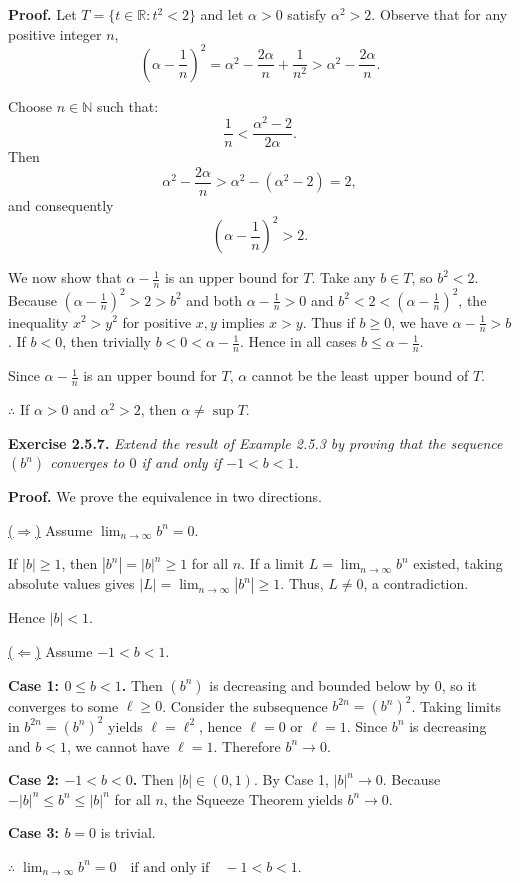 \documentclass[reqno,11pt]{amsart}
\begin{document}
\noindent\textbf{Proof.}
Let \(T = \{ t \in \mathbb{R} : t^2 < 2 \}\) and let \(\alpha > 0\) satisfy \(\alpha^2 > 2\).  
Observe that for any positive integer \(n\),
\[
\left( \alpha - \frac{1}{n} \right)^2 = \alpha^2 - \frac{2\alpha}{n} + \frac{1}{n^2} > \alpha^2 - \frac{2\alpha}{n}.
\]

Choose $n \in \mathbb{N}$ such that:
\[
\frac{1}{n} < \frac{\alpha^2 - 2}{2\alpha}.
\]
Then
\[
\alpha^2 - \frac{2\alpha}{n} > \alpha^2 - (\alpha^2 - 2) = 2,
\]
and consequently
\[
\left( \alpha - \frac{1}{n} \right)^2 > 2.
\]

We now show that \(\alpha - \frac{1}{n}\) is an upper bound for \(T\).  
Take any \(b \in T\), so \(b^2 < 2\). Because \((\alpha - \frac{1}{n})^2 > 2 > b^2\) and both \(\alpha - \frac{1}{n} > 0\) and \(b^2 < 2 < (\alpha - \frac{1}{n})^2\), the inequality \(x^2 > y^2\) for positive \(x, y\) implies \(x > y\).  
Thus if \(b \ge 0\), we have \(\alpha - \frac{1}{n} > b\).  
If \(b < 0\), then trivially \(b < 0 < \alpha - \frac{1}{n}\).  
Hence in all cases \(b \le \alpha - \frac{1}{n}\).

Since \(\alpha - \frac{1}{n}\) is an upper bound for \(T\), \(\alpha\) cannot be the least upper bound of \(T\).

$\therefore$ If \(\alpha > 0\) and \(\alpha^2 > 2\), then \(\alpha \neq \sup T\).

\newpage

\noindent\textbf{Exercise 2.5.7.}  
\textit{Extend the result of Example 2.5.3 by proving that the sequence $(b^n)$ converges to $0$ if and only if $-1 < b < 1$.}
\medskip

\noindent\textbf{Proof.}
We prove the equivalence in two directions.

\noindent\underline{($\Rightarrow$)} Assume $\displaystyle\lim_{n\to\infty} b^n = 0$.

If $|b| \ge 1$, then $|b^n| = |b|^n \ge 1$ for all $n$.  
If a limit $L =\displaystyle\lim_{n\to\infty} b^n$ existed, taking absolute values gives $|L| = \displaystyle\lim_{n\to\infty} |b^n| \ge 1$.  
Thus, $L \neq 0$, a contradiction.

Hence $|b| < 1$.

\noindent\underline{($\Leftarrow$)} Assume $-1 < b < 1$.

\noindent\textbf{Case 1: $0 \le b < 1$.}  
Then $(b^n)$ is decreasing and bounded below by $0$, so it converges to some $\ell \ge 0$.  
Consider the subsequence $b^{2n} = (b^n)^2$. Taking limits in $b^{2n} = (b^n)^2$ yields $\ell = \ell^2$, hence $\ell = 0$ or $\ell = 1$.  
Since $b^n$ is decreasing and $b < 1$, we cannot have $\ell = 1$. Therefore $b^n \to 0$.

\noindent\textbf{Case 2: $-1 < b < 0$.}  
Then $|b| \in (0,1)$. By Case 1, $|b|^n \to 0$.  
Because $-|b|^n \le b^n \le |b|^n$ for all $n$, the Squeeze Theorem yields $b^n \to 0$.

\noindent\textbf{Case 3: $b = 0$} is trivial.

\medskip
$\therefore \; \displaystyle\lim_{n\to\infty} b^n = 0 \quad \text{if and only if} \quad -1 < b < 1.$
\end{document}
